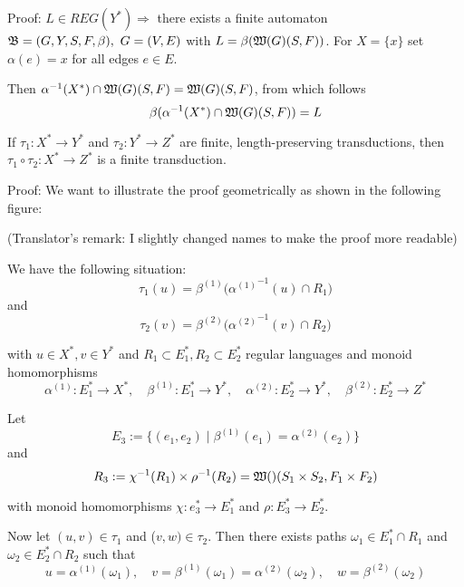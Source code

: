 Proof: $L \in REG(Y^*) \Rightarrow$ there exists a finite automaton $\mbox{$\mathfrak{B}$} =
(G, Y, S, F, \beta),\ G= (V, E)$ with $L = \beta(\mbox{$\mathfrak{W}(G)$}(S, F))$. For $X =
\{x\}$ set $\alpha(e) = x$ for all edges $e \in E$.

Then $\alpha^{-1}(X^*) \cap \mbox{$\mathfrak{W}(G)$}(S, F) = \mbox{$\mathfrak{W}(G)$}(S, F)$, from which
follows \[\beta(\alpha^{-1}(X^*) \cap \mbox{$\mathfrak{W}(G)$}(S, F)) = L\]

\begin{theorem}
If $\tau_1 : X^* \to Y^*$ and $\tau_2 : Y^* \to Z^*$ are finite,
length-preserving transductions, then $\tau_1 \circ \tau_2 : X^* \to Z^*$ is a
finite transduction.
\end{theorem}

Proof: We want to illustrate the proof geometrically as shown in the following
figure:

\begin{center}
\end{center}

(Translator's remark: I slightly changed names to make the proof more readable)

We have the following situation:
\[ \tau_1(u) = \beta^{(1)}\big( {\alpha^{(1)}}^{-1}(u) \cap R_1 \big) \]
and
\[ \tau_2(v) = \beta^{(2)}\big( {\alpha^{(2)}}^{-1}(v) \cap R_2 \big) \]

with $u \in X^*, v \in Y^*$ and $R_1 \subset E_1^*, R_2 \subset E_2^*$ regular
languages and monoid homomorphisms
\[ \alpha^{(1)} : E_1^* \to X^*,\quad \beta^{(1)} : E_1^* \to
Y^*,\quad \alpha^{(2)} : E_2^* \to Y^*,\quad \beta^{(2)} : E_2^* \to Z^* \]

Let
\[ E_3 := \{ (e_1, e_2) \mid \beta^{(1)}(e_1) = \alpha^{(2)}(e_2) \} \]
and 
\[ R_3 := \chi^{-1}(R_1) \times \rho^{-1}(R_2) = \mbox{$\mathfrak{W}()$}(S_1 \times S_2, F_1
\times F_2) \]

with monoid homomorphisms $\chi: e_3^* \to E_1^*$ and $\rho: E_3^* \to E_2^*$.

Now let $(u, v) \in \tau_1$ and ($v, w) \in \tau_2$. Then there exists paths
$\omega_1 \in E_1^* \cap R_1$ and $\omega_2 \in E_2^* \cap R_2$ such that 
\[ u = \alpha^{(1)}(\omega_1),\quad v = \beta^{(1)}(\omega_1) =
\alpha^{(2)}(\omega_2),\quad w = \beta^{(2)}(\omega_2) \]

